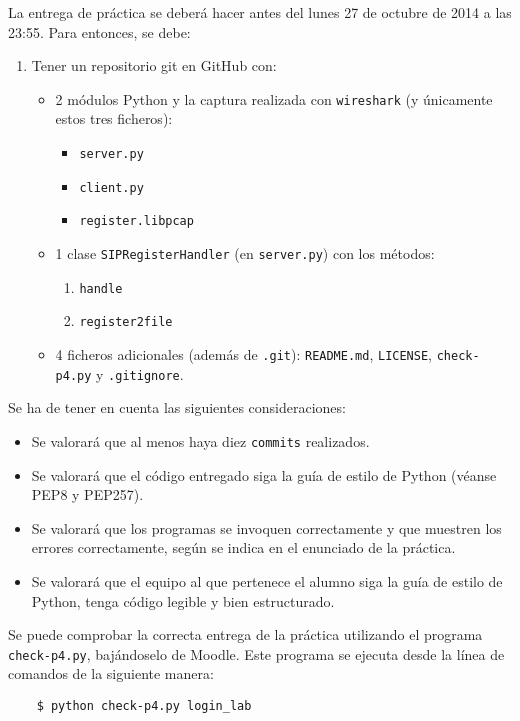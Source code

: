 \documentclass[11pt,a4paper]{article}
\begin{document}
La entrega de práctica se deberá hacer antes del lunes 27 de octubre de 2014 a las 23:55. Para entonces, se debe: 

\begin{enumerate}
  \item Tener un repositorio git en GitHub con:
  \begin{itemize}
    \item 2 módulos Python y la captura realizada con \texttt{wireshark} (y únicamente estos tres ficheros):
    \begin{itemize}
      \item \texttt{server.py}
      \item \texttt{client.py}
      \item \texttt{register.libpcap}
    \end{itemize}
    \item 1 clase \texttt{SIPRegisterHandler} (en \texttt{server.py}) con los métodos:
    \begin{enumerate}
      \item \texttt{handle}
      \item \texttt{register2file}
    \end{enumerate}
    \item 4 ficheros adicionales (además de \texttt{.git}): \texttt{README.md}, \texttt{LICENSE}, \texttt{check-p4.py} y \texttt{.gitignore}.
  \end{itemize}
\end{enumerate}

Se ha de tener en cuenta las siguientes consideraciones:
\begin{itemize}
  \item Se valorará que al menos haya diez \texttt{commits} realizados.
  \item Se valorará que el código entregado siga la guía de estilo de Python (véanse PEP8 y PEP257).
  \item Se valorará que los programas se invoquen correctamente y que muestren los errores correctamente, según se indica en el enunciado de la práctica.
  \item Se valorará que el equipo al que pertenece el alumno siga la guía de estilo
de Python, tenga código legible y bien estructurado.
\end{itemize}

Se puede comprobar la correcta entrega de la práctica utilizando el programa \texttt{check-p4.py}, bajándoselo de Moodle. Este programa se ejecuta desde la línea de comandos de la siguiente manera:
\begin{verbatim}
	$ python check-p4.py login_lab
\end{verbatim}
\end{document}
